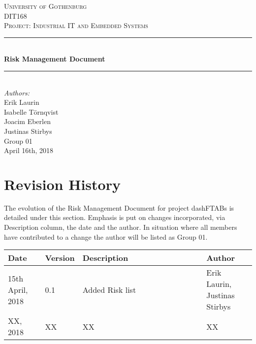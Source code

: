 \documentclass[12pt]{article}
\begin{document}
\begin{titlepage}

\newcommand{\Line}{\rule{\linewidth}{0.5mm}} 

\center
 
\textsc{\LARGE University of Gothenburg}
\\[3.5cm] 

\textsc{\Large DIT168}\\[0.3cm]
\textsc{\large Project: Industrial IT and Embedded Systems}\\[0.5cm]

\Line \\[0.4cm]
{\huge \bfseries Risk Management Document}\\[0.4cm]
\Line \\[0.5cm]
 
\Large \textit{Authors:}
\\Erik Laurin
\\Isabelle Törnqvist
\\Joacim Eberlen
\\Justinas Stirbys \\[4cm]

{\large Group 01} \\[0.3cm]
{\large April 16th, 2018}

\vfill

\end{titlepage}

\tableofcontents
\pagebreak


\section{Revision History}
The evolution of the Risk Management Document for project dashFTABs is detailed under this section. Emphasis is put on changes incorporated, via Description column, the date and the author. In situation where all members have contributed to a change the author will be listed as Group 01.
\begin{longtable}{ | p{0.15\linewidth} | p{0.15\linewidth} | p{0.5\linewidth} | p{0.3\linewidth} | }\hline 
    
    \textbf{Date} & \textbf{Version} & \textbf{Description} & \textbf{Author} \\ \hline
    15th April, 2018 & 0.1 & Added Risk list & Erik Laurin,  Justinas Stirbys\\ \hline
   	XX, 2018 & XX & XX & XX\\ \hline

\end{longtable}
\pagebreak
\end{document}
